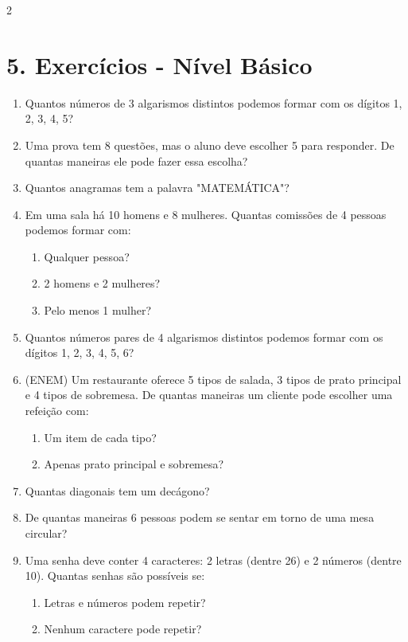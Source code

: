 \documentclass[11pt]{article}
\begin{document}
\begin{multicols}{2}
\section*{5. Exercícios - Nível Básico}

\begin{enumerate}[leftmargin=*]
\item Quantos números de 3 algarismos distintos podemos formar com os dígitos 1, 2, 3, 4, 5?

\item Uma prova tem 8 questões, mas o aluno deve escolher 5 para responder. De quantas maneiras ele pode fazer essa escolha?

\item Quantos anagramas tem a palavra "MATEMÁTICA"?

\item Em uma sala há 10 homens e 8 mulheres. Quantas comissões de 4 pessoas podemos formar com:
\begin{enumerate}[label=\alph*)]
\item Qualquer pessoa?
\item 2 homens e 2 mulheres?
\item Pelo menos 1 mulher?
\end{enumerate}

\item Quantos números pares de 4 algarismos distintos podemos formar com os dígitos 1, 2, 3, 4, 5, 6?

\item (ENEM) Um restaurante oferece 5 tipos de salada, 3 tipos de prato principal e 4 tipos de sobremesa. De quantas maneiras um cliente pode escolher uma refeição com:
\begin{enumerate}[label=\alph*)]
\item Um item de cada tipo?
\item Apenas prato principal e sobremesa?
\end{enumerate}

\item Quantas diagonais tem um decágono?

\item De quantas maneiras 6 pessoas podem se sentar em torno de uma mesa circular?

\item Uma senha deve conter 4 caracteres: 2 letras (dentre 26) e 2 números (dentre 10). Quantas senhas são possíveis se:
\begin{enumerate}[label=\alph*)]
\item Letras e números podem repetir?
\item Nenhum caractere pode repetir?
\end{enumerate}


\end{enumerate}
\end{multicols}
\end{document}
